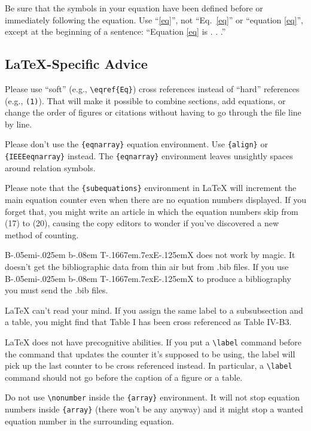 \documentclass[conference,a4paper]{IEEEtran}
\def\BibTeX{{\rm B\kern-.05em{\sc i\kern-.025em b}\kern-.08em
    T\kern-.1667em\lower.7ex\hbox{E}\kern-.125emX}}
\begin{document}
Be sure that the 
symbols in your equation have been defined before or immediately following 
the equation. Use ``\eqref{eq}'', not ``Eq.~\eqref{eq}'' or ``equation \eqref{eq}'', except at 
the beginning of a sentence: ``Equation \eqref{eq} is . . .''

\subsection{\LaTeX-Specific Advice}

Please use ``soft'' (e.g., \verb|\eqref{Eq}|) cross references instead
of ``hard'' references (e.g., \verb|(1)|). That will make it possible
to combine sections, add equations, or change the order of figures or
citations without having to go through the file line by line.

Please don't use the \verb|{eqnarray}| equation environment. Use
\verb|{align}| or \verb|{IEEEeqnarray}| instead. The \verb|{eqnarray}|
environment leaves unsightly spaces around relation symbols.

Please note that the \verb|{subequations}| environment in {\LaTeX}
will increment the main equation counter even when there are no
equation numbers displayed. If you forget that, you might write an
article in which the equation numbers skip from (17) to (20), causing
the copy editors to wonder if you've discovered a new method of
counting.

{\BibTeX} does not work by magic. It doesn't get the bibliographic
data from thin air but from .bib files. If you use {\BibTeX} to produce a
bibliography you must send the .bib files. 

{\LaTeX} can't read your mind. If you assign the same label to a
subsubsection and a table, you might find that Table I has been cross
referenced as Table IV-B3. 

{\LaTeX} does not have precognitive abilities. If you put a
\verb|\label| command before the command that updates the counter it's
supposed to be using, the label will pick up the last counter to be
cross referenced instead. In particular, a \verb|\label| command
should not go before the caption of a figure or a table.

Do not use \verb|\nonumber| inside the \verb|{array}| environment. It
will not stop equation numbers inside \verb|{array}| (there won't be
any anyway) and it might stop a wanted equation number in the
surrounding equation.
\end{document}
